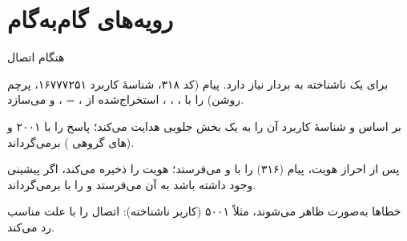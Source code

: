 \documentclass[11pt,a4paper]{article}
\begin{document}
\begin{acnfigure}
  \caption{چرخهٔ عمر همتای : برقراری انتقال، تبادل قابلیت، پاسبان و قطع اتصال.}
  \label{fig:peer}
\end{acnfigure}

\section{رویه‌های گام‌به‌گام}

\begin{procedurebox}{ هنگام اتصال}\label{proc:s6a}
\begin{steps}
  \item {} برای یک  ناشناخته به بردار نیاز دارد. پیام  (کد ۳۱۸، شناسهٔ کاربرد ۱۶۷۷۷۲۵۱،
        پرچم  روشن) را با ، ، ،
         استخراج‌شده از ،  = ،  و
         می‌سازد.
  \item {} بر اساس  و شناسهٔ کاربرد آن را به یک بخش جلویی  هدایت می‌کند؛
         پاسخ  را با  ۲۰۰۱ و  (های گروهی
        ) برمی‌گرداند.
  \item پس از احراز هویت،  پیام  (۳۱۶) را با  و  می‌فرستد؛ 
        هویت  را ذخیره می‌کند، اگر  پیشینی وجود داشته باشد به آن  می‌فرستد و  را با
         برمی‌گرداند.
  \item خطاها به‌صورت  ظاهر می‌شوند، مثلاً ۵۰۰۱ (کاربر ناشناخته):  اتصال را با علت
         مناسب رد می‌کند.
\end{steps}
\end{procedurebox}

\begin{acnfigure}
  \caption{تبادل‌های  هنگام اتصال از طریق یک عامل مسیریابی  (\cref{proc:s6a}).}
  \label{fig:s6a}
\end{acnfigure}
\end{document}
